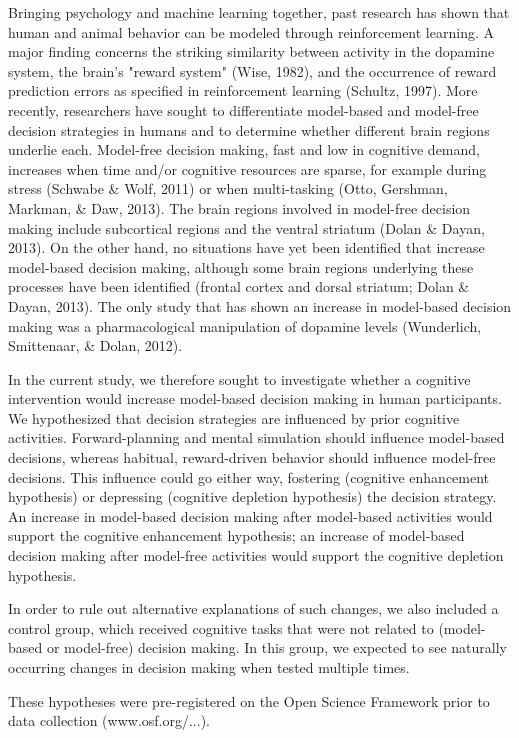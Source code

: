 \documentclass[11pt]{article} %
\begin{document}
Bringing psychology and machine learning together, past research has shown that human and animal behavior can be modeled through reinforcement learning. A major finding concerns the striking similarity between activity in the dopamine system, the brain's "reward system" (Wise, 1982), and the occurrence of reward prediction errors as specified in reinforcement learning (Schultz, 1997). More recently, researchers have sought to differentiate model-based and model-free decision strategies in humans and to determine whether different brain regions underlie each. Model-free decision making, fast and low in cognitive demand, increases when time and/or cognitive resources are sparse, for example during stress (Schwabe \& Wolf, 2011) or when multi-tasking (Otto, Gershman, Markman, \& Daw, 2013). The brain regions involved in model-free decision making include subcortical regions and the ventral striatum (Dolan \& Dayan, 2013). On the other hand, no situations have yet been identified that increase model-based decision making, although some brain regions underlying these processes have been identified (frontal cortex and dorsal striatum; Dolan \& Dayan, 2013). The only study that has shown an increase in model-based decision making was a pharmacological manipulation of dopamine levels (Wunderlich, Smittenaar, \& Dolan, 2012). 

In the current study, we therefore sought to investigate whether a cognitive intervention would increase model-based decision making in human participants. We hypothesized that decision strategies are influenced by prior cognitive activities. Forward-planning and mental simulation should influence model-based decisions, whereas habitual, reward-driven behavior should influence model-free decisions. This influence could go either way, fostering (cognitive enhancement hypothesis) or depressing (cognitive depletion hypothesis) the decision strategy. An increase in model-based decision making after model-based activities would support the cognitive enhancement hypothesis; an increase of model-based decision making after model-free activities would support the cognitive depletion hypothesis.

In order to rule out alternative explanations of such changes, we also included a control group, which received cognitive tasks that were not related to (model-based or model-free) decision making. In this group, we expected to see naturally occurring changes in decision making when tested multiple times. 

These hypotheses were pre-registered on the Open Science Framework prior to data collection (www.osf.org/...).
\end{document}
